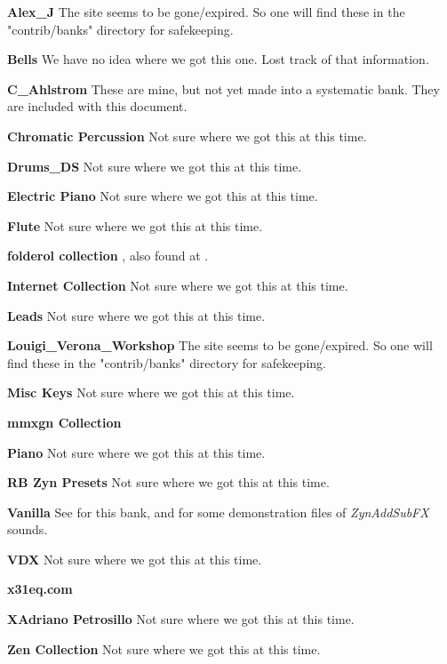    \begin{enumber}
      \item \textbf{Alex\_J}
         The site seems to be gone/expired. So one will find these in the
         "contrib/banks" directory for safekeeping.
      \item \textbf{Bells}
         We have no idea where we got this one.
         Lost track of that information.
      \item \textbf{C\_Ahlstrom}
         These are mine, but not yet made into a systematic bank.
         They are included with this document.
      \item \textbf{Chromatic Percussion}
         Not sure where we got this at this time.
      \item \textbf{Drums\_DS}
         Not sure where we got this at this time.
      \item \textbf{Electric Piano}
         Not sure where we got this at this time.
      \item \textbf{Flute}
         Not sure where we got this at this time.
      \item \textbf{folderol collection}
         \cite{folderol}, also found at \cite{zyndemos}.
      \item \textbf{Internet Collection}
         Not sure where we got this at this time.
      \item \textbf{Leads}
         Not sure where we got this at this time.
      \item \textbf{Louigi\_Verona\_Workshop}
         The site seems to be gone/expired. So one will find these in the
         "contrib/banks" directory for safekeeping.
      \item \textbf{Misc Keys}
         Not sure where we got this at this time.
      \item \textbf{mmxgn Collection} \cite{mmxgn}
      \item \textbf{Piano}
         Not sure where we got this at this time.
      \item \textbf{RB Zyn Presets}
         Not sure where we got this at this time.
      \item \textbf{Vanilla}
         See \cite{zyndemos} for this bank, and for some demonstration files
         of \textsl{ZynAddSubFX} sounds.
      \item \textbf{VDX}
         Not sure where we got this at this time.
      \item \textbf{x31eq.com} \cite{x31eq}
      \item \textbf{XAdriano Petrosillo}
         Not sure where we got this at this time.
      \item \textbf{Zen Collection}
         Not sure where we got this at this time.
   \end{enumber}

